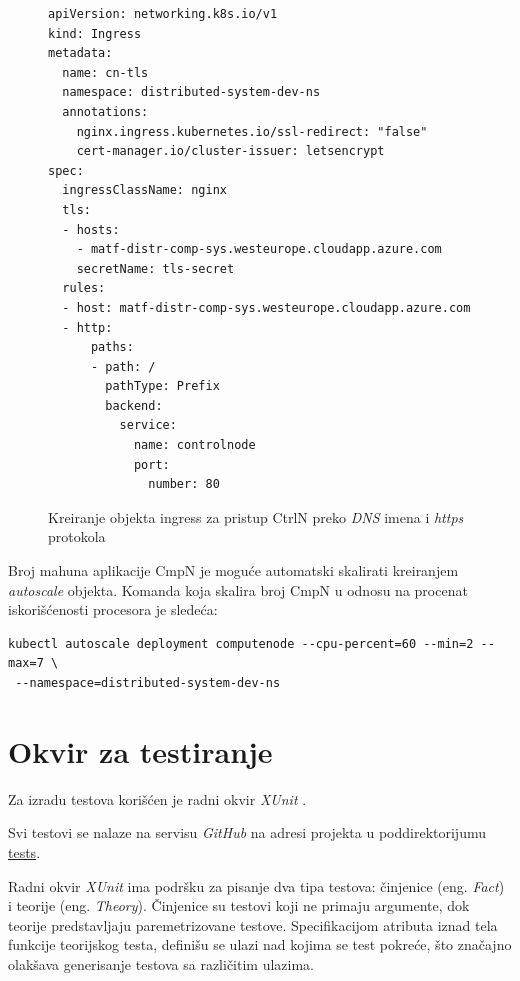 \documentclass[12pt,oneside]{memoir}
\begin{document}
\begin{figure}[h!]
\centering
\begin{lstlisting}[style=yaml]
apiVersion: networking.k8s.io/v1
kind: Ingress
metadata:
  name: cn-tls
  namespace: distributed-system-dev-ns
  annotations:
    nginx.ingress.kubernetes.io/ssl-redirect: "false"
    cert-manager.io/cluster-issuer: letsencrypt
spec:
  ingressClassName: nginx
  tls:
  - hosts:
    - matf-distr-comp-sys.westeurope.cloudapp.azure.com
    secretName: tls-secret
  rules:
  - host: matf-distr-comp-sys.westeurope.cloudapp.azure.com
  - http:
      paths:
      - path: /
        pathType: Prefix
        backend:
          service:
            name: controlnode
            port:
              number: 80
\end{lstlisting}
\caption{Kreiranje objekta ingress za pristup CtrlN preko \emph{DNS} imena i \emph{https} protokola}
\label{fig:controlnode_ingress_yaml}
\end{figure}

Broj mahuna aplikacije CmpN je moguće automatski skalirati kreiranjem \emph{autoscale} objekta. Komanda koja skalira broj CmpN u odnosu na procenat iskorišćenosti procesora je sledeća:

\begin{verbatim}
kubectl autoscale deployment computenode --cpu-percent=60 --min=2 --max=7 \
 --namespace=distributed-system-dev-ns
\end{verbatim}

\section{Okvir za testiranje}
\label{sec:testiranjesistema}

Za izradu testova korišćen je radni okvir \emph{XUnit} \cite{XUnit}.

Svi testovi se nalaze na servisu \emph{GitHub} na adresi projekta u poddirektorijumu \href{https://github.com/milana-kovacevic/DistributedComputationSystem/tree/main/tests}{tests}.

Radni okvir \emph{XUnit} ima podršku za pisanje dva tipa testova: činjenice (eng. \emph{Fact}) i teorije (eng. \emph{Theory}). Činjenice su testovi koji ne primaju argumente, dok teorije predstavljaju paremetrizovane testove. Specifikacijom atributa iznad tela funkcije teorijskog testa, definišu se ulazi nad kojima se test pokreće, što značajno olakšava generisanje testova sa različitim ulazima.
\end{document}
